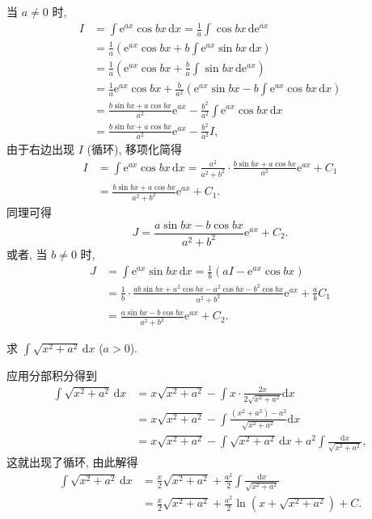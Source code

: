 \begin{solution}[解法 2]
当 $a\neq 0$ 时,
\begin{align*}
I&=\int\mathrm{e}^{ax}\cos bx\,\mathrm{d}x=\frac{1}{a}\int\cos bx\,\mathrm{d}\mathrm{e}^{ax}\\
&=\frac{1}{a}\left(\mathrm{e}^{ax}\cos bx+b\int\mathrm{e}^{ax}\sin bx\,\mathrm{d}x\right)\\
&=\frac{1}{a}\left(\mathrm{e}^{ax}\cos bx+\frac{b}{a}\int\sin bx\,\mathrm{d}\mathrm{e}^{ax}\right)\\
&=\frac{1}{a}\mathrm{e}^{ax}\cos bx+\frac{b}{a^{2}}\left(\mathrm{e}^{ax}\sin bx-b\int\mathrm{e}^{ax}\cos bx\,\mathrm{d}x\right)\\
&=\frac{b\sin bx+a\cos bx}{a^{2}}\mathrm{e}^{ax}-\frac{b^{2}}{a^{2}}\int\mathrm{e}^{ax}\cos bx\,\mathrm{d}x\\
&=\frac{b\sin bx+a\cos bx}{a^{2}}\mathrm{e}^{ax}-\frac{b^{2}}{a^{2}}I,
\end{align*}
由于右边出现 $I$ (循环), 移项化简得
\begin{align*}
I&=\int\mathrm{e}^{ax}\cos bx\,\mathrm{d}x=\frac{a^{2}}{a^{2}+b^{2}}\cdot\frac{b\sin bx+a\cos bx}{a^{2}}\mathrm{e}^{ax}+C_{1}\\
&=\frac{b\sin bx+a\cos bx}{a^{2}+b^{2}}\mathrm{e}^{ax}+C_{1}.
\end{align*}
同理可得
\[
J=\frac{a\sin bx-b\cos bx}{a^{2}+b^{2}}\mathrm{e}^{ax}+C_{2}.
\]
或者, 当 $b\neq 0$ 时,
\begin{align*}
J&=\int\mathrm{e}^{ax}\sin bx\,\mathrm{d}x=\frac{1}{b}(aI-\mathrm{e}^{ax}\cos bx)\\
&=\frac{1}{b}\cdot\frac{ab\sin bx+a^{2}\cos bx-a^{2}\cos bx-b^{2}\cos bx}{a^{2}+b^{2}}\mathrm{e}^{ax}+\frac{a}{b}C_{1}\\
&=\frac{a\sin bx-b\cos bx}{a^{2}+b^{2}}\mathrm{e}^{ax}+C_{2}.
\end{align*}
\end{solution}

\begin{example}\label{ex:5.2.13}
求 $\int\sqrt{x^{2}+a^{2}}\,\mathrm{d}x$ ($a>0$).
\end{example}

\begin{solution}[解法 1]
应用分部积分得到
\begin{align*}
\int\sqrt{x^{2}+a^{2}}\,\mathrm{d}x&=x\sqrt{x^{2}+a^{2}}-\int x\cdot\frac{2x}{2\sqrt{x^{2}+a^{2}}}\mathrm{d}x\\
&=x\sqrt{x^{2}+a^{2}}-\int\frac{(x^{2}+a^{2})-a^{2}}{\sqrt{x^{2}+a^{2}}}\mathrm{d}x\\
&=x\sqrt{x^{2}+a^{2}}-\int\sqrt{x^{2}+a^{2}}\,\mathrm{d}x+a^{2}\int\frac{\mathrm{d}x}{\sqrt{x^{2}+a^{2}}},
\end{align*}
这就出现了循环, 由此解得
\begin{align*}
\int\sqrt{x^{2}+a^{2}}\,\mathrm{d}x&=\frac{x}{2}\sqrt{x^{2}+a^{2}}+\frac{a^{2}}{2}\int\frac{\mathrm{d}x}{\sqrt{x^{2}+a^{2}}}\\
&=\frac{x}{2}\sqrt{x^{2}+a^{2}}+\frac{a^{2}}{2}\ln(x+\sqrt{x^{2}+a^{2}})+C.
\end{align*}
\end{solution}

